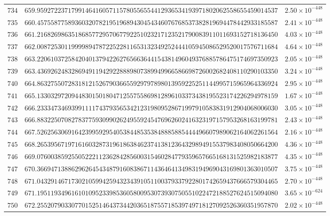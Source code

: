 \documentclass[12pt,reqno]{amsart}
\theoremstyle{remark}
\begin{document}
\begin{longtable}{clc}
$734$ & $659.9592722371799146416057115780556554412936534193971802062558655459014537$ & $2.50\times 10^{-448}$ \\
$735$ & $660.4575587758936032078219519689430454346076768537382819694478442933185587$ & $2.41\times 10^{-448}$ \\
$736$ & $661.2168269863518685772957067792251023217123521790083911011693152718136450$ & $4.03\times 10^{-448}$ \\
$737$ & $662.0087253011999989478722522811653132349252444105945086529520017576711684$ & $4.64\times 10^{-448}$ \\
$738$ & $663.2206103725842040137942262765663644154381496049376885786475174697350923$ & $2.05\times 10^{-448}$ \\
$739$ & $663.4369262483286949119429228889807389949966586698726002682408110290103350$ & $3.24\times 10^{-448}$ \\
$740$ & $664.8632755072831812152679036655929797898013959225251144995715965964336924$ & $2.95\times 10^{-448}$ \\
$741$ & $665.1330329720944830150180471255755869812896103373438195523174226294978159$ & $1.67\times 10^{-448}$ \\
$742$ & $666.2333473469399111174379356534212319809528671997910583831912904068006030$ & $3.05\times 10^{-448}$ \\
$743$ & $666.8832250708278377593099026249559245476962602416323197157953268163199781$ & $2.43\times 10^{-448}$ \\
$744$ & $667.5262563069164239959295405384485353848885885444496607989062164062261564$ & $2.16\times 10^{-448}$ \\
$745$ & $668.2653956719716160328731961863846237413812364329894915537983408050664200$ & $4.36\times 10^{-448}$ \\
$746$ & $669.0760038592550522211236284285600315460284779359657665168131525982183877$ & $4.35\times 10^{-448}$ \\
$747$ & $670.3669471388629626454348791608386711436464134983194969043169801363010507$ & $3.75\times 10^{-448}$ \\
$748$ & $671.0432914671730210599425943234391051100379337922801742659437666579304465$ & $2.70\times 10^{-448}$ \\
$749$ & $671.1951193496161010952339853605800953073930750551022472188527624515094080$ & $3.65\times 10^{-624}$ \\
$750$ & $672.2552079033077015251464373442036518755718539749718127092526360351957870$ & $2.02\times 10^{-448}$ \\

\end{longtable}
\end{document}
